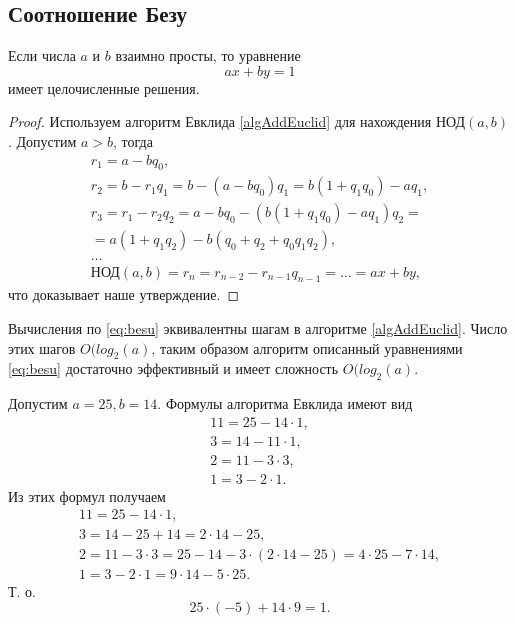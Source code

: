 \subsection{Соотношение Безу}

\begin{theorem}[Безу]
\label{thm:besu}
Если числа $a$ и $b$ взаимно просты, то уравнение 
\[
ax + by = 1
\] 
имеет целочисленные решения.
\begin{proof}
Используем алгоритм Евклида \ref{algAddEuclid} для нахождения
$\mbox{НОД}\left(a, b\right)$.
Допустим $a > b$, тогда
\begin{eqnarray}
r_1 = a - b q_0, 
\nonumber \\
r_2 = b - r_1 q_1 = b - (a - b q_0)q_1 = b(1+q_1 q_0) - a q_1, 
\nonumber \\
r_3 = r_1 - r_2 q_2 = a - b q_0 - \left(b(1+q_1 q_0) - a q_1\right)q_2
= \nonumber \\
= a(1+q_1 q_2) - b(q_0 + q_2 + q_0 q_1 q_2),
\nonumber \\
\dots
\nonumber \\
\mbox{НОД}\left(a, b\right) = r_n = r_{n-2} - r_{n-1} q_{n-1} = \dots
= a x + b y, 
\label{eq:besu}
\end{eqnarray}
что доказывает наше утверждение.
\end{proof}
\end{theorem}

\begin{remark}
\label{rem:besu}
Вычисления по \eqref{eq:besu} эквивалентны шагам в алгоритме
\ref{algAddEuclid}. Число этих шагов $O(log_2(a)$, таким образом
алгоритм описанный уравнениями \eqref{eq:besu} достаточно эффективный
и  имеет сложность $O(log_2(a)$.
\end{remark}

\begin{example}
\label{ex:besu}
Допустим $a = 25, b = 14$. Формулы алгоритма Евклида имеют вид
\begin{eqnarray}
11 = 25 - 14 \cdot 1,
\nonumber \\
3 = 14 - 11 \cdot 1,
\nonumber \\
2 = 11 - 3 \cdot 3,
\nonumber \\
1 = 3 - 2 \cdot 1.
\nonumber
\end{eqnarray}
Из этих формул получаем
\begin{eqnarray}
11 = 25 - 14 \cdot 1,
\nonumber \\
3 = 14 - 25 + 14 = 2 \cdot 14 - 25,
\nonumber \\
2 = 11 - 3 \cdot 3 = 25 - 14 - 3 \cdot (2 \cdot 14 - 25) = 4 \cdot 25 - 7 \cdot
14,
\nonumber \\
1 = 3 - 2 \cdot 1 = 9 \cdot 14 - 5 \cdot 25.
\nonumber
\end{eqnarray}
Т. о. 
\[
25 \cdot (-5)  + 14 \cdot 9 = 1.
\]
\end{example}
